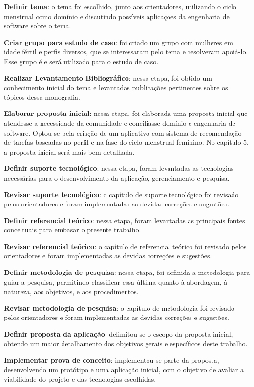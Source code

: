\textbf{Definir tema}: o tema foi escolhido, junto aos orientadores, utilizando o ciclo menstrual como domínio e discutindo
possíveis aplicações da engenharia de software sobre o tema. 

\textbf{Criar grupo para estudo de caso}: foi criado um grupo com mulheres em idade fértil e perfis diversos, 
que se interessaram pelo tema e resolveram apoiá-lo. Esse grupo é e será utilizado 
para o estudo de caso.

\textbf{Realizar Levantamento Bibliográfico}: nessa etapa, foi obtido um conhecimento 
inicial do tema e levantadas publicações pertinentes sobre os tópicos dessa monografia. 

\textbf{Elaborar proposta inicial}: nessa etapa, foi elaborada uma proposta inicial que 
atendesse a necessidade da comunidade e conciliasse domínio e engenharia de software. 
Optou-se pela criação de um aplicativo com sistema de recomendação de tarefas baseadas no perfil e
na fase do ciclo menstrual feminino. No capítulo 5, a proposta inicial será mais bem detalhada.

\textbf{Definir suporte tecnológico}: nessa etapa, foram levantadas as tecnologias necessárias para o desenvolvimento da aplicação, 
gerenciamento e pesquisa.

\textbf{Revisar suporte tecnológico}: o capítulo de suporte tecnológico foi revisado pelos orientadores e foram implementadas as devidas correções e sugestões.

\textbf{Definir referencial teórico}: nessa etapa, foram levantadas as principais fontes conceituais para embasar o presente trabalho.

\textbf{Revisar referencial teórico}: o capítulo de referencial teórico foi revisado pelos orientadores e foram implementadas as devidas correções e sugestões.

\textbf{Definir metodologia de pesquisa}: nessa etapa, foi definida a metodologia 
para guiar a pesquisa, permitindo classificar essa última quanto
à abordagem, à natureza, aos objetivos, e aos procedimentos.

\textbf{Revisar metodologia de pesquisa}: o capítulo de metodologia foi revisado pelos orientadores e foram implementadas as devidas correções e sugestões.

\textbf{Definir proposta da aplicação}: delimitou-se o escopo da proposta inicial, obtendo um maior detalhamento 
dos objetivos gerais e específicos deste trabalho.

\textbf{Implementar prova de conceito}: implementou-se parte da proposta, desenvolvendo um protótipo e uma aplicação inicial, com o objetivo 
de avaliar a viabilidade do projeto e das tecnologias escolhidas.

